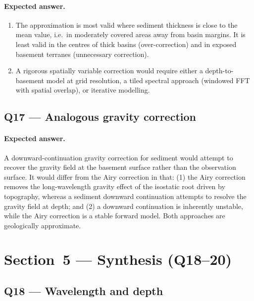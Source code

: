 \documentclass[11pt]{article}
\begin{document}
\paragraph{Expected answer.}
\begin{enumerate}[label=\alph*.]
  \item The approximation is most valid where sediment thickness is close to the
        mean value, i.e.\ in moderately covered areas away from basin margins.
        It is least valid in the centres of thick basins (over-correction) and
        in exposed basement terranes (unnecessary correction).
  \item A rigorous spatially variable correction would require either a
        depth-to-basement model at grid resolution, a tiled spectral approach
        (windowed FFT with spatial overlap), or iterative modelling.
\end{enumerate}

\subsection*{Q17 — Analogous gravity correction}

\paragraph{Expected answer.}
A downward-continuation gravity correction for sediment would attempt to recover
the gravity field at the basement surface rather than the observation surface.
It would differ from the Airy correction in that: (1) the Airy correction removes
the long-wavelength gravity effect of the isostatic root driven by topography,
whereas a sediment downward continuation attempts to resolve the gravity field at
depth; and (2) a downward continuation is inherently unstable, while the Airy
correction is a stable forward model.  Both approaches are geologically
approximate.

\section{Section~5 — Synthesis (Q18--20)}

\subsection*{Q18 — Wavelength and depth}
\end{document}

